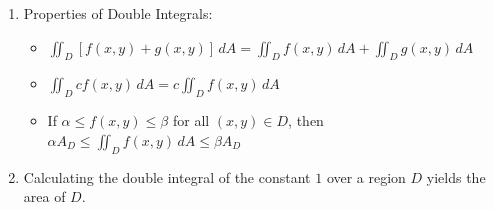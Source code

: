 \documentclass[10pt]{article}
\begin{document}
\begin{multicols}{2}
\begin{enumerate}
\begin{enumerate}
        \item Properties of Double Integrals:
        \begin{itemize}
            \item $\iint_D [f(x,y) + g(x,y)] \,dA = \iint_D f(x,y) \,dA + \iint_D g(x,y) \,dA$
            \item $\iint_D cf(x,y) \,dA = c \iint_D f(x,y) \,dA$
            \item If $\alpha \leq f(x,y) \leq \beta$ for all $(x,y) \in D$, then $\alpha A_D \leq \iint_D f(x,y) \,dA \leq \beta A_D$
        \end{itemize} 
        
        \item Calculating the double integral of the constant $1$ over a region $D$ yields the area of $D$.
        
    \end{enumerate}
    

\end{enumerate}
\end{multicols}
\end{document}

